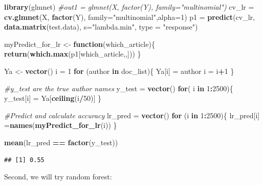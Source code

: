 \documentclass[]{article}
\newenvironment{Shaded}{\begin{snugshade}}{\end{snugshade}}
\newcommand{\CommentTok}[1]{\textcolor[rgb]{0.56,0.35,0.01}{\textit{#1}}}
\newcommand{\ControlFlowTok}[1]{\textcolor[rgb]{0.13,0.29,0.53}{\textbf{#1}}}
\newcommand{\DataTypeTok}[1]{\textcolor[rgb]{0.13,0.29,0.53}{#1}}
\newcommand{\DecValTok}[1]{\textcolor[rgb]{0.00,0.00,0.81}{#1}}
\newcommand{\KeywordTok}[1]{\textcolor[rgb]{0.13,0.29,0.53}{\textbf{#1}}}
\newcommand{\NormalTok}[1]{#1}
\newcommand{\OperatorTok}[1]{\textcolor[rgb]{0.81,0.36,0.00}{\textbf{#1}}}
\newcommand{\StringTok}[1]{\textcolor[rgb]{0.31,0.60,0.02}{#1}}
\begin{document}
\begin{Shaded}
\begin{Highlighting}[]
\KeywordTok{library}\NormalTok{(glmnet)}
\CommentTok{#out1 = glmnet(X, factor(Y), family="multinomial")}
\NormalTok{cv_lr =}\StringTok{ }\KeywordTok{cv.glmnet}\NormalTok{(X, }\KeywordTok{factor}\NormalTok{(Y), }\DataTypeTok{family=}\StringTok{"multinomial"}\NormalTok{,}\DataTypeTok{alpha=}\DecValTok{1}\NormalTok{)}
\NormalTok{p1 =}\StringTok{ }\KeywordTok{predict}\NormalTok{(cv_lr, }\KeywordTok{data.matrix}\NormalTok{(test.data), }\DataTypeTok{s=}\StringTok{"lambda.min"}\NormalTok{, }\DataTypeTok{type =} \StringTok{"response"}\NormalTok{)}

\NormalTok{myPredict_for_lr <-}\StringTok{ }\ControlFlowTok{function}\NormalTok{(which_article)\{}
  \KeywordTok{return}\NormalTok{(}\KeywordTok{which.max}\NormalTok{(p1[which_article,,]))}
\NormalTok{\}}

\NormalTok{Ya  <-}\StringTok{ }\KeywordTok{vector}\NormalTok{()}
\NormalTok{i =}\StringTok{ }\DecValTok{1}
\ControlFlowTok{for}\NormalTok{ (author }\ControlFlowTok{in}\NormalTok{ doc_list)\{}
\NormalTok{  Ya[i] =}\StringTok{ }\NormalTok{author}
\NormalTok{  i =}\StringTok{ }\NormalTok{i}\OperatorTok{+}\DecValTok{1}
\NormalTok{\}}

\CommentTok{#y_test are the true author names}
\NormalTok{y_test =}\StringTok{ }\KeywordTok{vector}\NormalTok{()}
\ControlFlowTok{for}\NormalTok{( i }\ControlFlowTok{in} \DecValTok{1}\OperatorTok{:}\DecValTok{2500}\NormalTok{)\{}
\NormalTok{  y_test[i] =}\StringTok{ }\NormalTok{Ya[}\KeywordTok{ceiling}\NormalTok{(i}\OperatorTok{/}\DecValTok{50}\NormalTok{)]}
\NormalTok{\}}

\CommentTok{#Predict and calculate accuracy}
\NormalTok{lr_pred =}\StringTok{ }\KeywordTok{vector}\NormalTok{()}
\ControlFlowTok{for}\NormalTok{ (i }\ControlFlowTok{in} \DecValTok{1}\OperatorTok{:}\DecValTok{2500}\NormalTok{)\{}
\NormalTok{  lr_pred[i] =}\KeywordTok{names}\NormalTok{(}\KeywordTok{myPredict_for_lr}\NormalTok{(i))}
\NormalTok{\}}

\KeywordTok{mean}\NormalTok{(lr_pred }\OperatorTok{==}\StringTok{ }\KeywordTok{factor}\NormalTok{(y_test))}
\end{Highlighting}
\end{Shaded}

\begin{verbatim}
## [1] 0.55
\end{verbatim}

Second, we will try random forest:
\end{document}
